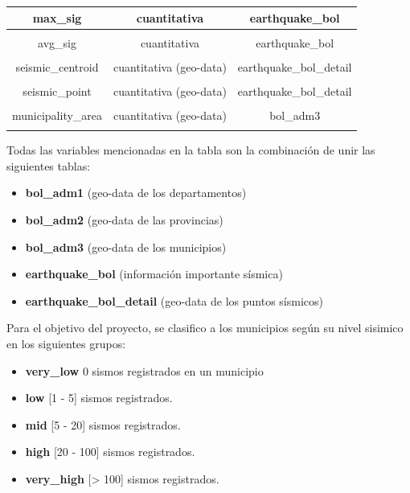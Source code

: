 \documentclass[12pt]{article}
\begin{document}
\begin{table}[H]
\begin{tabular}{c c c}
	max\_sig & cuantitativa & earthquake\_bol
  	\\ [1ex]
	\hline & \\[-1.5ex]
	
	avg\_sig & cuantitativa & earthquake\_bol
  	\\ [1ex]
	\hline & \\[-1.5ex]
	
	seismic\_centroid & cuantitativa (geo-data) & earthquake\_bol\_detail
  	\\ [1ex]
	\hline & \\[-1.5ex]
	
	seismic\_point & cuantitativa (geo-data) & earthquake\_bol\_detail
  	\\ [1ex]
	\hline & \\[-1.5ex]
	
	municipality\_area & cuantitativa (geo-data) & bol\_adm3
  	\\ [1ex]
	\hline & \\[-1.5ex]

\end{tabular}
\label{table:nonlin}
\end{table}


Todas las variables mencionadas en la tabla son la combinación de unir las siguientes tablas:

\begin{itemize}
\item \textbf{bol\_adm1} (geo-data de los departamentos)
\item \textbf{bol\_adm2} (geo-data de las provincias)
\item \textbf{bol\_adm3} (geo-data de los municipios)
\item \textbf{earthquake\_bol} (información importante sísmica)
\item \textbf{earthquake\_bol\_detail} (geo-data de los puntos sísmicos)
\end{itemize}



Para el objetivo del proyecto, se clasifico a los municipios según su nivel sisimico en los siguientes grupos:

\begin{itemize}
\item \textbf{very\_low} 	0 sismos registrados en un municipio
\item \textbf{low}		[1 - 5] sismos registrados.
\item \textbf{mid}		[5 - 20] sismos registrados.
\item \textbf{high}		[20 - 100] sismos registrados.
\item \textbf{very\_high}	[> 100] sismos registrados.
\end{itemize}
\end{document}
